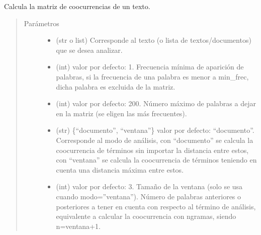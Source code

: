 \documentclass[letterpaper,10pt,openany,spanish]{sphinxmanual}
\begin{document}
\begin{fulllineitems}
\label{\detokenize{funciones/exploracion:exploracion.matriz_coocurrencias}}
Calcula la matriz de co\sphinxhyphen{}ocurrencias de un texto.
\begin{quote}\begin{description}
\item[{Parámetros}] \leavevmode\begin{itemize}
\item {} 
 \textendash{} (str o list) Corresponde al texto (o lista de textos/documentos) que se desea analizar.

\item {} 
 \textendash{} (int) valor por defecto: 1. Frecuencia mínima de aparición de palabras, si la frecuencia de una palabra es menor a min\_frec, dicha palabra es excluida de la matriz.

\item {} 
 \textendash{} (int) valor por defecto: 200. Número máximo de palabras a dejar en la matriz (se eligen las más frecuentes).

\item {} 
 \textendash{} (str) \{“documento”, “ventana”\} valor por defecto: “documento”. Corresponde al modo de análisis, con “documento” se calcula la co\sphinxhyphen{}ocurrencia de términos sin importar la distancia entre estos,  con “ventana” se calcula la co\sphinxhyphen{}ocurrencia de términos teniendo en cuenta una distancia máxima entre estos.

\item {} 
 \textendash{} (int) valor por defecto: 3. Tamaño de la ventana (solo se usa cuando modo=”ventana”). Número de palabras anteriores o posteriores a tener en cuenta con respecto al término de análisis, equivalente a calcular la co\sphinxhyphen{}ocurrencia con n\sphinxhyphen{}gramas, siendo n=ventana+1.


\end{itemize}
\end{description}
\end{quote}
\end{fulllineitems}
\end{document}
